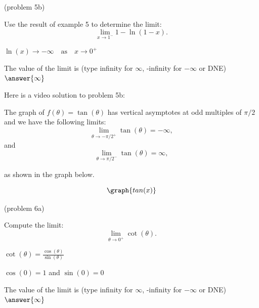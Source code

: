 \documentclass[handout]{ximera}
\begin{document}
\begin{problem}(problem 5b)
  
	Use the result of example 5 to determine the limit:
  \[
  \lim_{x \to {1^-}} 1 - \ln(1-x).
  \]
		\begin{hint}
		  $\ln(x) \to -\infty \quad \text{as} \quad x \to 0^+$
		\end{hint}	
		The value of the limit is
		(type infinity for $\infty$, -infinity for $-\infty$ or DNE)
		 $\answer{\infty}$
		
\end{problem}

Here is a video solution to problem 5b:
\begin{foldable}
\end{foldable}

\begin{example}[example 6]
The graph of $f(\theta) = \tan(\theta)$ has vertical asymptotes at odd multiples of $\pi/2$ and
we have the following limits: 
\[
\lim_{\theta\to -\pi/2^+} \tan(\theta) = -\infty,
\]
and
\[
\lim_{\theta\to \pi/2^-} \tan(\theta) = \infty,
\]

as shown in the graph below.
		
			
\[
\graph{tan(x)}
\]
\end{example}

\begin{problem}(problem 6a)
  
	Compute the limit:
  \[
  \lim_{\theta \to {0^+}} \cot(\theta).
  \]
		\begin{hint}
		  $\cot(\theta) = \frac{\cos(\theta)}{\sin(\theta)}$
		\end{hint}	
		\begin{hint}
		  $\cos(0) = 1$ and $\sin(0) = 0$
		\end{hint}
		
		The value of the limit is
		(type infinity for $\infty$, -infinity for $-\infty$ or DNE)
		 $\answer{\infty}$
		
\end{problem}
\end{document}
